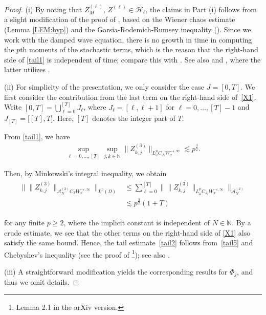 \documentclass[letterpaper, 11pt,  reqno]{amsart}
\newcommand{\1}{\hspace{0.5mm}\text{I}\hspace{0.2mm}}
\newcommand{\noi}{\noindent}
\newcommand{\N}{\mathbb{N}}
\renewcommand{\H}{\mathcal{H}}
\newcommand{\eps}{\varepsilon}
\newcommand{\les}{\lesssim}
\newcommand{\A}{\mathcal{A}}
\renewcommand{\O}{\Omega}
\renewcommand{\o}{\omega}
\renewcommand{\l}{\ell}
\numberwithin{equation}{section}
\numberwithin{theorem}{section}
\begin{document}
\begin{proof}
(i) 
By noting that $Z^{(\l)}_M, \, Z^{(\l)} \in \H_\l$, 
the claims in Part (i) 
follows from 
a slight modification of 
the proof of 
\cite[Lemma~2.3]{GKOT}, 
based on 
the Wiener chaos estimate (Lemma \ref{LEM:hyp})
and 
the Garsia-Rodemich-Rumsey inequality
(\cite[Lemma~2.2]{GKOT}).
Since we work with the damped wave equation, 
there is no growth in time
in computing the $p$th moments of 
the stochastic terms,
which is the reason that the right-hand side of \eqref{tail1}
is independent of time;
compare this with \cite[(2.7)]{GKOT}.
See also  \cite[Proposition~2.1]{GKO}
and 
\cite[Lemma~3.1]{GKO2}, 
where the latter utilizes
  \cite[Proposition~2.7 and Lemma~A.1]{OOTz}.
 
 
 
 
\medskip

\noi
(ii)
For simplicity of the presentation, 
we only consider the case $J = [0, T]$.
We first consider the contribution from the last term
on the right-hand side of~\eqref{X1}. 
Write $[0, T] = \bigcup_{\l = 0}^{[T]} J_\l$, 
where $J_\l = [\l, \l+1]$ for $\l = 0, \dots, [T] - 1$
and $J_{[T]} = \big[[T], T\big]$.
Here, $[T]$ denotes the integer part of $T$.


From 
 \eqref{tail1}, 
we have 
\begin{align*}
\sup_{\l = 0, \dots, [T]} 
\sup_{j, k \in \N}
\|Z_{k, j}^{(3)}  \|_{L^p_\o C_{J_\l} W_x^{- \eps, \infty}}
\les p ^\frac 32.
\end{align*}

\noi
Then, by Minkowski's integral inequality, we obtain
\begin{align}
\begin{split}
\Big\|\|Z_{k, j}^{(3)}  \|_{\A^{(2)}_N C_T W_x^{- \eps, \infty}}\Big\|_{L^p(\O)}
& \le 
\sum_{\l = 0}^{[T]}
\Big\|\|Z_{k, j}^{(3)}  \|_{L^p_\o C_{J_\l} W_x^{- \eps, \infty}}\Big\|_{\A_N^{(2)}}\\
& \les  p ^\frac 32 ( 1+ T)
\end{split}
\label{tail5}
\end{align}

\noi
for any finite $p \ge 2$, 
where the implicit constant is independent of $N \in \N$.
By a crude estimate, 
we see that 
the other terms on the right-hand side of \eqref{X1}
also satisfy the same bound.
Hence, 
the  tail estimate~\eqref{tail2} 
follows
from~\eqref{tail5} and Chebyshev's inequality
(see the proof of \cite[Lemma 3]{BOP1}\footnote{Lemma 2.1 in the arXiv version.}); see also \cite[Lemma~4.5]{Tz10}.



\medskip

\noi
(iii) A straightforward modification yields the corresponding results for $\Phi_j$, 
and thus we omit details.
\end{proof}
\end{document}
